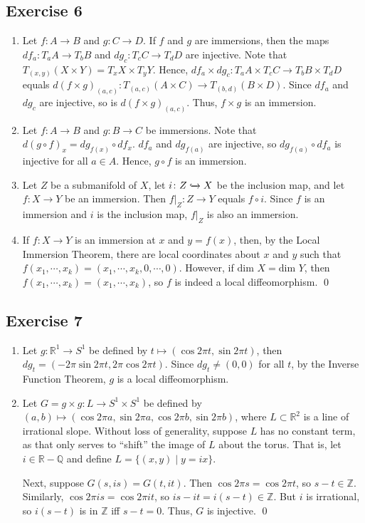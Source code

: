 \documentclass{article}
\newcommand{\Z}{\mathbb{Z}}
\newcommand{\Q}{\mathbb{Q}}
\newcommand{\R}{\mathbb{R}}
\begin{document}
\subsection*{Exercise 6}
  \begin{enumerate}[label=(\alph*)]
    \item{
      Let $f\colon A\to B$ and $g\colon C\to D$. If $f$ and $g$ are immersions,
      then the maps $df_a\colon T_aA\to T_bB$ and $dg_c\colon T_cC\to T_dD$ are
      injective. Note that $T_{(x,y)}(X\times Y)=T_xX\times T_yY$. Hence, $df_a
      \times dg_c\colon T_aA\times T_cC\to T_bB\times T_dD$ equals $d(f\times g)
      _{(a,c)}\colon T_{(a,c)}(A\times C)\to T_{(b,d)}(B\times D)$. Since $df_a$
      and $dg_c$ are injective, so is $d(f\times g)_{(a,c)}$. Thus, $f\times g$
      is an immersion.
    }
    \item{
      Let $f\colon A\to B$ and $g\colon B\to C$ be immersions. Note that $d(g
      \circ f)_x=dg_{f(x)}\circ df_x$. $df_a$ and $dg_{f(a)}$ are injective, so
      $dg_{f(a)}\circ df_a$ is injective for all $a\in A$. Hence, $g\circ f$ is
      an immersion.
    }
    \item{
      Let $Z$ be a submanifold of $X$, let $i\colon Z\xhookrightarrow{} X$ be
      the inclusion map, and let $f\colon X\to Y$ be an immersion. Then $f|_Z
      \colon Z\to Y$ equals $f\circ i$. Since $f$ is an immersion and $i$ is the
      inclusion map, $f|_Z$ is also an immersion.
    }
    \item{
      If $f\colon X\to Y$ is an immersion at $x$ and $y=f(x)$, then, by the
      Local Immersion Theorem, there are local coordinates about $x$ and $y$
      such that $f(x_1,\cdots,x_k)=(x_1,\cdots,x_k,0,\cdots,0)$. However, if
      $\text{dim }X=\text{dim }Y$, then $f(x_1,\cdots,x_k)=(x_1,\cdots,x_k)$, so
      $f$ is indeed a  local diffeomorphism.
    }
    \qed
  \end{enumerate}

\subsection*{Exercise 7}
  \begin{enumerate}[label=(\alph*)]
    \item{
      Let $g\colon\R^1\to S^1$ be defined by $t\mapsto(\cos2\pi t,\sin2\pi t)$,
      then $dg_t = (-2\pi\sin2\pi t,2\pi\cos2\pi t)$. Since $dg_t\ne(0,0)$ for
      all $t$, by the Inverse Function Theorem, $g$ is a local diffeomorphism.
    }
    \item{
      Let $G=g\times g\colon L\to S^1\times S^1$ be defined by $(a,b)\mapsto(
      \cos2\pi a,\sin2\pi a,\cos2\pi b,\sin2\pi b)$, where $L\subset\R^2$ is a
      line of irrational slope. Without loss of generality, suppose $L$ has no
      constant term, as that only serves to ``shift'' the image of $L$ about the
      torus. That is, let $i\in\R-\Q$ and define $L=\{(x,y)\mid y=ix\}$.

      Next, suppose $G(s,is)=G(t,it)$. Then $\cos2\pi s=\cos2\pi t$, so $s-t\in
      \Z$. Similarly, $\cos2\pi is=\cos2\pi it$, so $is-it=i(s-t)\in\Z$. But $i$
      is irrational, so $i(s-t)$ is in $\Z$ iff $s-t=0$. Thus, $G$ is injective.
      \qed
    }
  \end{enumerate}
\end{document}

